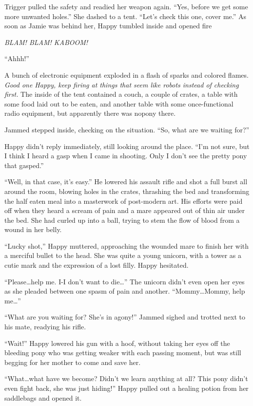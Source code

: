 Trigger pulled the safety and readied her weapon again. ``Yes, before we get some more unwanted holes.'' She dashed to a tent. ``Let's check this one, cover me.'' As soon as Jamie was behind her, Happy tumbled inside and opened fire

\emph{BLAM! BLAM! KABOOM!}

 ``Ahhh!''

A bunch of electronic equipment exploded in a flash of sparks and colored flames. \emph{Good one Happy, keep firing at things that seem like robots instead of checking first.} The inside of the tent contained a couch, a couple of crates, a table with some food laid out to be eaten, and another table with some once-functional radio equipment, but apparently there was nopony there.

Jammed stepped inside, checking on the situation. ``So, what are we waiting for?''

Happy didn't reply immediately, still looking around the place. ``I'm not sure, but I think I heard a gasp when I came in shooting. Only I don't see the pretty pony that gasped.''

``Well, in that case, it's easy.'' He lowered his assault rifle and shot a full burst all around the room, blowing holes in the crates, thrashing the bed and transforming the half eaten meal into a masterwork of post-modern art. His efforts were paid off when they heard a scream of pain and a mare appeared out of thin air under the bed. She had curled up into a ball, trying to stem the flow of blood from a wound in her belly.

``Lucky shot,'' Happy muttered, approaching the wounded mare to finish her with a merciful bullet to the head. She was quite a young unicorn, with a tower as a cutie mark and the expression of a lost filly. Happy hesitated.

``Please\dots help me. I-I don't want to die\dots'' The unicorn didn't even open her eyes as she pleaded between one spasm of pain and another. ``Mommy\dots Mommy, help me\dots''

``What are you waiting for? She's in agony!'' Jammed sighed and trotted next to his mate, readying his rifle.

``Wait!'' Happy lowered his gun with a hoof, without taking her eyes off the bleeding pony who was getting weaker with each passing moment, but was still begging for her mother to come and save her.

``What\dots what have we become? Didn't we learn anything at all? This pony didn't even fight back, she was just hiding!'' Happy pulled out a healing potion from her saddlebags and opened it.

